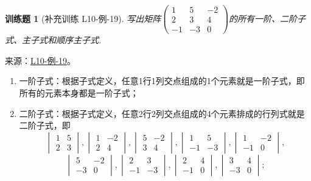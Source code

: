 \documentclass[12pt,fontset=fandol]{ctexart}
\newtheorem{exercise}{训练题}[section]
\begin{document}
\begin{exercise}[补充训练 L10-例-19]\label{prob:L10-例-19}
写出矩阵$\begin{pmatrix}
            1 & 5 & -2 \\ 2 & 3 & 4 \\ -1 & -3 & 0
        \end{pmatrix}$的所有一阶、二阶子式、主子式和顺序主子式.
\end{exercise}
\noindent 来源：\href{https://github.com/yhwu-is/Linear-Algebra-Left-Undone/blob/new/%E8%AE%B2%E4%B9%89/%E4%B8%93%E9%A2%98/10%20%E8%A1%8C%E5%88%97%E5%BC%8F.tex}{L10-例-19}。
\begin{solve}
\begin{enumerate}
        \item 一阶子式：根据子式定义，任意1行1列交点组成的1个元素就是一阶子式，即所有的元素本身都是一阶子式；

        \item 二阶子式：根据子式定义，任意2行2列交点组成的4个元素排成的行列式就是二阶子式，即
              \[\begin{vmatrix}
                      1 & 5 \\
                      2 & 3
                  \end{vmatrix},\begin{vmatrix}
                      1 & -2 \\
                      2 & 4
                  \end{vmatrix},\begin{vmatrix}
                      5 & -2 \\
                      3 & 4
                  \end{vmatrix},\begin{vmatrix}
                      1  & 5  \\
                      -1 & -3
                  \end{vmatrix},\begin{vmatrix}
                      1  & -2 \\
                      -1 & 0
                  \end{vmatrix},\]\[\begin{vmatrix}
                      5  & -2 \\
                      -3 & 0
                  \end{vmatrix},\begin{vmatrix}
                      2  & 3  \\
                      -1 & -3
                  \end{vmatrix},\begin{vmatrix}
                      2  & 4 \\
                      -1 & 0
                  \end{vmatrix},\begin{vmatrix}
                      3  & 4 \\
                      -3 & 0
                  \end{vmatrix};\]


\end{enumerate}
\end{solve}
\end{document}
